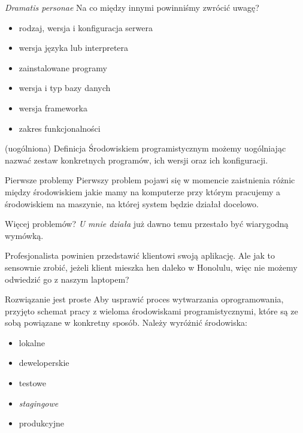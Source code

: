 \begin{frame}{\emph{Dramatis personae}}
	Na co między innymi powinniśmy zwrócić uwagę?
	\begin{itemize}
		\item rodzaj, wersja i konfiguracja serwera
		\item wersja języka lub interpretera
		\item zainstalowane programy
		\item wersja i typ bazy danych
		\item wersja frameworka
		\item zakres funkcjonalności
	\end{itemize}
\end{frame}

\begin{frame}{(uogólniona) Definicja}
	Środowiskiem programistycznym możemy uogólniając nazwać zestaw konkretnych programów, ich wersji oraz ich konfiguracji.
\end{frame}

\begin{frame}{Pierwsze problemy}
	Pierwszy problem pojawi się w momencie zaistnienia różnic między środowiskiem jakie mamy na komputerze przy którym pracujemy a środowiskiem na maszynie, na której system będzie działał docelowo.
\end{frame}

\begin{frame}{Więcej problemów?}
	\emph{U mnie działa} już dawno temu przestało być wiarygodną wymówką.
	
	Profesjonalista powinien przedstawić klientowi swoją aplikację. Ale jak to sensownie zrobić, jeżeli klient mieszka hen daleko w Honolulu, więc nie możemy odwiedzić go z naszym laptopem?
\end{frame}

\begin{frame}{Rozwiązanie jest proste}
	Aby usprawić proces wytwarzania oprogramowania, przyjęto schemat pracy z wieloma środowiskami programistycznymi, które są ze sobą powiązane w konkretny sposób. Należy wyróżnić środowiska:
	\begin{itemize}
		\item lokalne
		\item deweloperskie
		\item testowe
		\item \emph{stagingowe}
		\item produkcyjne
	\end{itemize}
\end{frame}

